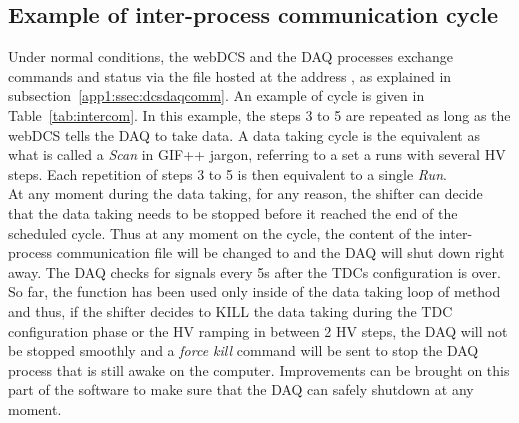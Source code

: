     \subsection{Example of inter-process communication cycle}
    \label{app1:ssec:commex}
    
    Under normal conditions, the webDCS and the DAQ processes exchange commands and status via the file hosted at the address , as explained in subsection~\ref{app1:ssec:dcsdaqcomm}. An example of cycle is given in Table~\ref{tab:intercom}. In this example, the steps 3 to 5 are repeated as long as the webDCS tells the DAQ to take data. A data taking cycle is the equivalent as what is called a \textit{Scan} in GIF++ jargon, referring to a set a runs with several HV steps. Each repetition of steps 3 to 5 is then equivalent to a single \textit{Run}.\\
    
    At any moment during the data taking, for any reason, the shifter can decide that the data taking needs to be stopped before it reached the end of the scheduled cycle. Thus at any moment on the cycle, the content of the inter-process communication file will be changed to  and the DAQ will shut down right away. The DAQ checks for  signals every 5s after the TDCs configuration is over. So far, the function  has been used only inside of the data taking loop of method  and thus, if the shifter decides to KILL the data taking during the TDC configuration phase or the HV ramping in between 2 HV steps, the DAQ will not be stopped smoothly and a \textit{force kill} command will be sent to stop the DAQ process that is still awake on the computer. Improvements can be brought on this part of the software to make sure that the DAQ can safely shutdown at any moment.\\
    

